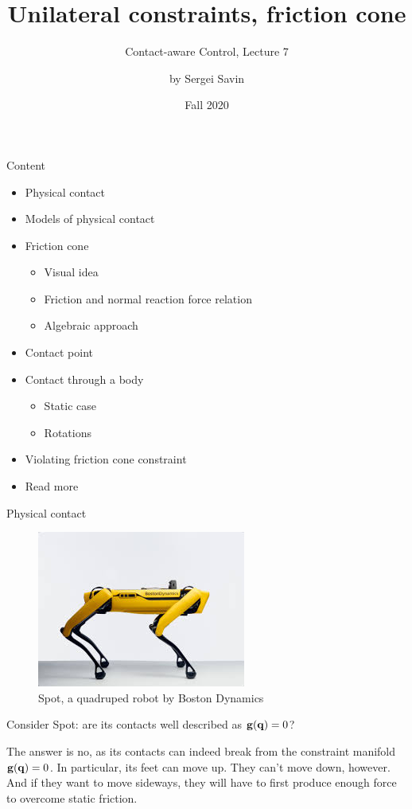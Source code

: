\documentclass{beamer}
\title{Unilateral constraints, friction cone}
\subtitle{Contact-aware Control, Lecture 7}
\author{by Sergei Savin}
\date{Fall 2020}
\begin{document}
\maketitle


\begin{frame}{Content}

\begin{itemize}
\item Physical contact
\item Models of physical contact
\item Friction cone
\begin{itemize}
\item Visual idea
\item Friction and normal reaction force relation
\item Algebraic approach
\end{itemize}
\item Contact point
\item Contact through a body
\begin{itemize}
\item Static case
\item Rotations
\end{itemize}
\item Violating friction cone constraint
\item Read more
\end{itemize}

\end{frame}



\begin{frame}{Physical contact}
\begin{flushleft}

\begin{figure}
    \centering
    \includegraphics[width=0.45 \linewidth]{fig_SPOT.jpeg}
    \caption{Spot, a quadruped robot by Boston Dynamics}
    \label{fig:spot}
\end{figure}

Consider Spot: are its contacts well described as $\mathbf{g}(\mathbf{q}) = 0$?

\bigskip

The answer is no, as its contacts can indeed break from the constraint manifold $\mathbf{g}(\mathbf{q}) = 0$. In particular, its feet can move up. They can't move down, however. And if they want to move sideways, they will have to first produce enough force to overcome static friction.

\end{flushleft}
\end{frame}
\end{document}
